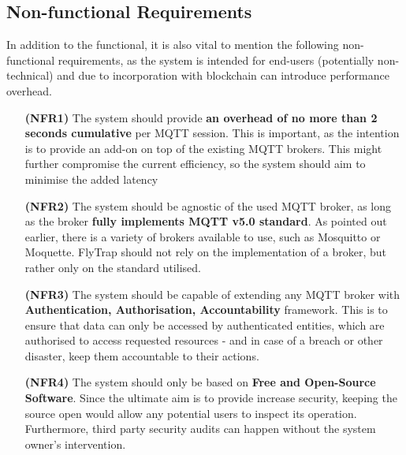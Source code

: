 \subsection{Non-functional Requirements}

In addition to the functional, it is also vital to mention the following non-functional requirements, as the system is intended for end-users (potentially non-technical) and due to incorporation with blockchain can introduce performance overhead.

\begin{itemize}[leftmargin=4.5em]
\item[\textbf{(NFR1)}] The system should provide \textbf{an overhead of no more than 2 seconds cumulative} per MQTT session. This is important, as the intention is to provide an add-on on top of the existing MQTT brokers. This might further compromise the current efficiency, so the system should aim to minimise the added latency 
\item[\textbf{(NFR2)}] The system should be agnostic of the used MQTT broker, as long as the broker \textbf{fully implements MQTT v5.0 standard}. As pointed out earlier, there is a variety of brokers available to use, such as Mosquitto or Moquette. FlyTrap should not rely on the implementation of a broker, but rather only on the standard utilised.
\item[\textbf{(NFR3)}] The system should be capable of extending any MQTT broker with \textbf{Authentication, Authorisation, Accountability} framework. This is to ensure that data can only be accessed by authenticated entities, which are authorised to access requested resources - and in case of a breach or other disaster, keep them accountable to their actions.
\item[\textbf{(NFR4)}] The system should only be based on \textbf{Free and Open-Source Software}. Since the ultimate aim is to provide increase security, keeping the source open would allow any potential users to inspect its operation. Furthermore, third party security audits can happen without the system owner's intervention.
\end{itemize}


